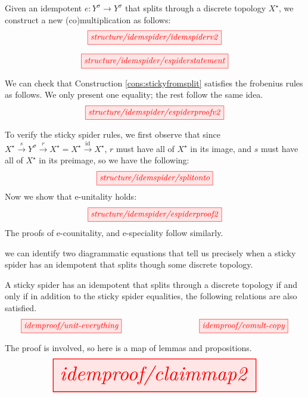 \begin{myboxB}
\begin{construction}\label{cons:stickyfromsplit}
Given an idempotent $e: Y^\sigma \rightarrow Y^\sigma$ that splits through a discrete topology $X^\star$, we construct a new (co)multiplication as follows:
\[\scalebox{1}{\tikzfig{structure/idemspider/idemspiderv2}}\]
\end{construction}
\end{myboxB}

\begin{myboxR}
\begin{proposition}\label{prop:splitmeanssticky}
\[\scalebox{1}{\tikzfig{structure/idemspider/espiderstatement}}\]
\end{proposition}
We can check that Construction \ref{cons:stickyfromsplit} satisfies the frobenius rules as follows. We only present one equality; the rest follow the same idea.
\[\scalebox{1}{\tikzfig{structure/idemspider/espiderproofv2}}\]
\end{myboxR}
\begin{myboxR}
To verify the sticky spider rules, we first observe that since $X^\star \overset{s}{\rightarrow} Y^\sigma \overset{r}{\rightarrow} X^\star = X^\star \overset{\mathop{id}}{\rightarrow} X^\star$, $r$ must have all of $X^\star$ in its image, and $s$ must have all of $X^\star$ in its preimage, so we have the following:
\[\scalebox{1}{\tikzfig{structure/idemspider/splitonto}}\]
Now we show that e-unitality holds:
\[\scalebox{1}{\tikzfig{structure/idemspider/espiderproof2}}\]
The proofs of e-counitality, and e-speciality follow similarly.
\end{myboxR}

\begin{myboxB}
 we can identify two diagrammatic equations that tell us precisely when a sticky spider has an idempotent that splits though some discrete topology.
\begin{theorem}\label{thm:stickygraphical}
A sticky spider has an idempotent that splits through a discrete topology if and only if in addition to the sticky spider equalities, the following relations are also satisfied.
\[\scalebox{1}{\tikzfig{idemproof/unit-everything}} \quad\quad\quad\quad\quad\quad\quad\quad \scalebox{1}{\tikzfig{idemproof/comult-copy}}\]
\end{theorem}
The proof is involved, so here is a map of lemmas and propositions.
\[\resizebox{0.8\textwidth}{!}{\tikzfig{idemproof/claimmap2}}\]
\end{myboxB}

